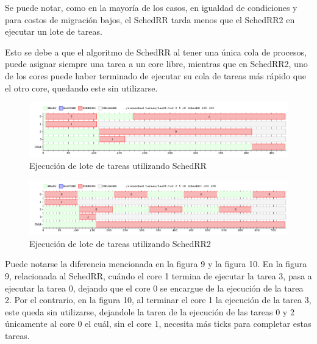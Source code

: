 \documentclass[a4paper,10pt,twoside]{article}
\begin{document}
Se puede notar, como en la mayoría de los casos, en igualdad de condiciones y para costos de migración bajos, el SchedRR tarda menos que el SchedRR2 en ejecutar un lote de tareas.

Esto se debe a que el algoritmo de SchedRR al tener una única cola de procesos, puede asignar siempre una tarea a un core libre, mientras que en SchedRR2, uno de los cores puede haber terminado de ejecutar su cola de tareas más rápido que el otro core, quedando este sin utilizarse.

\begin{figure}[ht!]
\centering
\includegraphics[width=175mm]{../ejercicio8/schedRRej8.png}
\caption{Ejecución de lote de tareas utilizando SchedRR}
\label{overflow}
\end{figure}

\begin{figure}[ht!]
\centering
\includegraphics[width=175mm]{../ejercicio8/schedRR2ej8.png}
\caption{Ejecución de lote de tareas utilizando SchedRR2}
\label{overflow}
\end{figure}

Puede notarse la diferencia mencionada en la figura 9 y la figura 10. En la figura 9, relacionada al SchedRR, cuándo el core 1 termina de ejecutar la tarea 3, pasa a ejecutar la tarea 0, dejando que el core 0 se encargue de la ejecución de la tarea 2. Por el contrario, en la figura 10, al terminar el core 1 la ejecución de la tarea 3, este queda sin utilizarse, dejandole la tarea de la ejecución de las tareas 0 y 2 únicamente al core 0 el cuál, sin el core 1, necesita más ticks para completar estas tareas.

\end{document}
